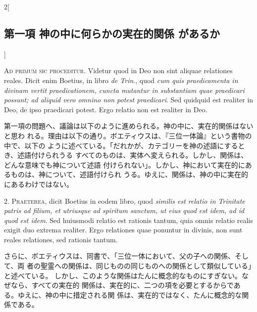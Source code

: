 \documentclass[paper=a4paper,fontsize=10pt,jafontsize=9pt,titlepage]{jlreq}
\begin{document}
\begin{paracol}{2}[\subsection{第一項 神の中に何らかの実在的関係 があるか}]

{\Huge A}{\scshape d primum sic proceditur}. Videtur quod in Deo non sint
aliquae relationes reales. Dicit enim Boetius, in libro {\itshape de Trin}.,
quod {\itshape cum quis praedicamenta in divinam vertit praedicationem, cuncta
mutantur in substantiam quae praedicari possunt; ad aliquid vero omnino non
potest praedicari}. Sed quidquid est realiter in Deo, de ipso praedicari
potest. Ergo relatio non est realiter in Deo.


\switchcolumn


第一項の問題へ、議論は以下のように進められる。神の中に、実在的関係はないと思わ
 れる。理由は以下の通り。ボエティウスは、『三位一体論』という書物の中で、以下の
 ように述べている。「だれかが、カテゴリーを神の述語にするとき、述語付けられうる
 すべてのものは、実体へ変えられる。しかし、関係は、どんな意味でも神について述語
 付けられない」。しかし、神において実在的にあるものは、神について、述語付けられ
 うる。ゆえに、関係は、神の中に実在的にあるわけではない。




2. {\scshape Praeterea}, dicit Boetius in eodem libro, quod {\itshape similis
est relatio in Trinitate patris ad filium, et utriusque ad spiritum sanctum, ut
eius quod est idem, ad id quod est idem}. Sed huiusmodi relatio est rationis
tantum, quia omnis relatio realis exigit duo extrema realiter. Ergo relationes
quae ponuntur in divinis, non sunt reales relationes, sed rationis tantum.


\switchcolumn


さらに、ボエティウスは、同書で、「三位一体において、父の子への関係、そして、両
 者の聖霊への関係は、同じものの同じものへの関係として類似している」と述べている。
 しかし、このような関係はたんに概念的なものにすぎない。なぜなら、すべての実在的
 関係は、実在的に、二つの項を必要とするからである。ゆえに、神の中に措定される関
 係は、実在的ではなく、たんに概念的な関係である。





\end{paracol}
\end{document}
